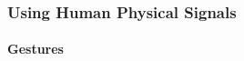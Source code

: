 \documentclass[12pt, a4paper]{article}
\begin{document}



    


\subsubsection{Using Human Physical Signals}

\paragraph{Gestures}
\end{document}
